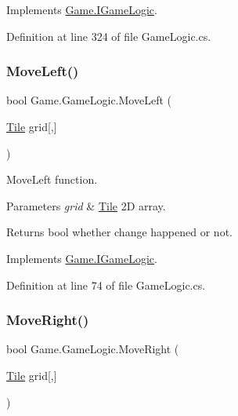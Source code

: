 Implements \mbox{\hyperlink{interface_game_1_1_i_game_logic_ae4106eb97e72a42e76fd0d286fd7b10b}{Game.\+I\+Game\+Logic}}.



Definition at line 324 of file Game\+Logic.\+cs.

\mbox{\label{class_game_1_1_game_logic_a641318ffaa89d83863f56895f09b50c5}} 
\subsubsection{\texorpdfstring{MoveLeft()}{MoveLeft()}}
{\footnotesize\ttfamily bool Game.\+Game\+Logic.\+Move\+Left (\begin{DoxyParamCaption}\item[{\mbox{\hyperlink{class_game_1_1_tile}{Tile}}}]{grid\mbox{[},\mbox{]} }\end{DoxyParamCaption})}



Move\+Left function. 


\begin{DoxyParams}{Parameters}
{\em grid} & \mbox{\hyperlink{class_game_1_1_tile}{Tile}} 2D array.\\
\hline
\end{DoxyParams}
\begin{DoxyReturn}{Returns}
bool whether change happened or not.
\end{DoxyReturn}


Implements \mbox{\hyperlink{interface_game_1_1_i_game_logic_abae3146afb71b9b144c13b189a26fb17}{Game.\+I\+Game\+Logic}}.



Definition at line 74 of file Game\+Logic.\+cs.

\mbox{\label{class_game_1_1_game_logic_ad35edbf38f3151d792d4c4cce51c4a2b}} 
\subsubsection{\texorpdfstring{MoveRight()}{MoveRight()}}
{\footnotesize\ttfamily bool Game.\+Game\+Logic.\+Move\+Right (\begin{DoxyParamCaption}\item[{\mbox{\hyperlink{class_game_1_1_tile}{Tile}}}]{grid\mbox{[},\mbox{]} }\end{DoxyParamCaption})}



